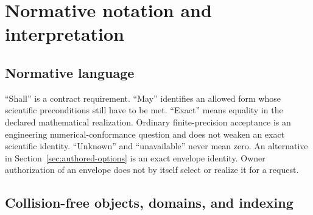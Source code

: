 \section{Normative notation and interpretation}
\label{sec:notation}

\newcommand{\ContractID}{\texttt{SCI-FLT-MATCHED}}
\newcommand{\Req}[1]{\texttt{SCI-FLT-\allowbreak MATCHED-\allowbreak REQ-\allowbreak #1}}
\newcommand{\Pred}[1]{\texttt{SCI-FLT-\allowbreak MATCHED-\allowbreak PRED-\allowbreak #1}}
\newcommand{\AO}[1]{\texttt{SCI-FLT-\allowbreak MATCHED-\allowbreak AO-\allowbreak #1}}
\newcommand{\AOpt}[2]{\texttt{SCI-FLT-\allowbreak MATCHED-\allowbreak AO-\allowbreak #1-\allowbreak #2}}
\newcommand{\Unavailable}{\textsf{unavailable}}
\newcommand{\Failed}{\textsf{failed}}
\newcommand{\Complete}{\textsf{complete publication candidate}}
\newcommand{\Disabled}{\textsf{disabled}}
\newcommand{\Superseded}{\textsf{superseded}}
\newcommand{\NotRequested}{\textsf{not requested}}
\newcommand{\Requested}{\textsf{requested}}
\newcommand{\Effective}{\textsf{effective}}
\newcommand{\LearnedCandidate}{\textsf{learned candidate}}
\newcommand{\Resolved}{\textsf{resolved}}
\newcommand{\Applied}{\textsf{applied}}
\newcommand{\Realized}{\textsf{realized}}
\newcommand{\PublicationDecided}{\textsf{publication decided}}
\newcommand{\Published}{\textsf{published}}
\newcommand{\NotProduced}{\textsf{not produced}}
\newcommand{\R}{\mathbb{R}}
\newcommand{\C}{\mathbb{C}}
\newcommand{\Dom}{\mathcal{D}}
\newcommand{\Supp}{\mathcal{S}}
\newcommand{\Null}{\mathcal{N}}
\newcommand{\Valid}{\mathcal{V}}
\newcommand{\Lin}{\mathcal{L}}

\subsection{Normative language}

``Shall'' is a contract requirement. ``May'' identifies an allowed form whose
scientific preconditions still have to be met. ``Exact'' means equality in the
declared mathematical realization. Ordinary finite-precision acceptance is an
engineering numerical-conformance question and does not weaken an exact
scientific identity. ``Unknown'' and ``unavailable'' never mean zero. An
alternative in Section~\ref{sec:authored-options} is an exact envelope identity.
Owner authorization of an envelope does not by itself select or realize it for
a request.

\subsection{Collision-free objects, domains, and indexing}

